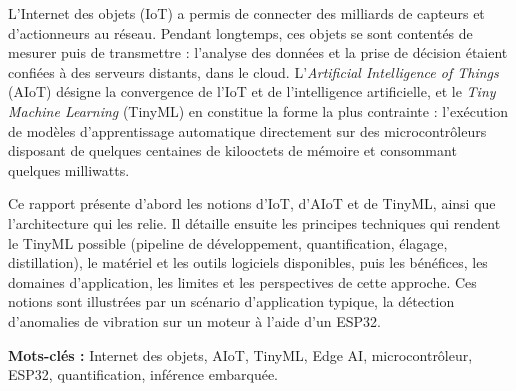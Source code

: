 \documentclass[11pt,a4paper]{report}
\begin{document}
L'Internet des objets (IoT) a permis de connecter des milliards de capteurs et
d'actionneurs au réseau. Pendant longtemps, ces objets se sont contentés de
mesurer puis de transmettre : l'analyse des données et la prise de décision
étaient confiées à des serveurs distants, dans le cloud. L'\emph{Artificial
Intelligence of Things} (AIoT) désigne la convergence de l'IoT et de
l'intelligence artificielle, et le \emph{Tiny Machine Learning} (TinyML) en
constitue la forme la plus contrainte : l'exécution de modèles d'apprentissage
automatique directement sur des microcontrôleurs disposant de quelques centaines
de kilooctets de mémoire et consommant quelques milliwatts.

Ce rapport présente d'abord les notions d'IoT, d'AIoT et de TinyML, ainsi que
l'architecture qui les relie. Il détaille ensuite les principes techniques qui
rendent le TinyML possible (pipeline de développement, quantification, élagage,
distillation), le matériel et les outils logiciels disponibles, puis les
bénéfices, les domaines d'application, les limites et les perspectives de cette
approche. Ces notions sont illustrées par un scénario d'application typique,
la détection d'anomalies de vibration sur un moteur à l'aide d'un ESP32.

\textbf{Mots-clés :} Internet des objets, AIoT, TinyML, Edge AI, microcontrôleur,
ESP32, quantification, inférence embarquée.

\tableofcontents

\clearpage
{}










\clearpage
{}
{}
\nocite{*}
\printbibheading[title={Bibliographie et webographie}]
\printbibliography[keyword=ouvrage,heading=subbibliography,title={Ouvrages de référence}]
\printbibliography[keyword=article,heading=subbibliography,title={Articles scientifiques}]
\printbibliography[keyword=rapport,heading=subbibliography,title={Normes, rapports et documentation technique}]
\printbibliography[keyword=web,heading=subbibliography,title={Ressources en ligne et communautés}]
\end{document}
